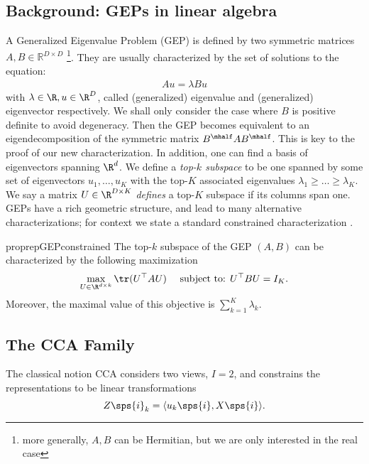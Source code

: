 \subsection{Background: GEPs in linear algebra}
A Generalized Eigenvalue Problem (GEP) is defined by two symmetric matrices $A,B\in \mathbb{R}^{D\times D}$ \citep{stewart_matrix_1990}\footnote{more generally, $A,B$ can be Hermitian, but we are only interested in the real case}.
They are usually characterized by the set of solutions to the equation:
\begin{align}\label{eq:igep}
Au=\lambda Bu
\end{align}
with $\lambda \in \R, u \in \R^D$, called (generalized) eigenvalue and (generalized) eigenvector respectively. We shall only consider the case where $B$ is positive definite to avoid degeneracy.
Then the GEP becomes equivalent to an eigendecomposition of the symmetric matrix $B^\mhalf A B^\mhalf$. This is key to the proof of our new characterization.
In addition, one can find a basis of eigenvectors spanning $\R^d$.
We define a \textit{top-$k$ subspace} to be one spanned by some set of eigenvectors {$u_1,\dots,u_K$} with the top-$K$ associated eigenvalues $\lambda_1 \geq \dots \geq \lambda_K$.
We say a matrix $U \in \R^{D \times K}$ \textit{defines} a top-$K$ subspace if its columns span one.
GEPs have a rich geometric structure, and lead to many alternative characterizations; for context we state a standard constrained characterization \citep{stewart_matrix_1990}.

\begin{restatable}{proprep}{GEPconstrained}
\label{prop:GEP-constrained}
    The top-$k$ subspace of the GEP $(A,B)$ can be characterized by the following maximization \begin{equation}\label{eq:gep-constrained-subspace-formulation}
        \max_{U \in \R^{d\times k}} \tr(U^{\top} A U) \quad \text{ subject to: }  U^{\top} B U = I_K.
        \end{equation}
    Moreover, the maximal value of this objective is $\sum_{k=1}^K \lambda_k$.
\end{restatable}

\subsection{The CCA Family}\label{sec:CCA Definition}
The classical notion CCA \citep{hotelling1992relations} considers two views, $I=2$, and constrains the representations to be linear transformations
\begin{equation}\label{eq:cca-linear-function-def}
    Z\sps{i}_k = \langle u_k\sps{i} , X\sps{i} \rangle.
\end{equation}

